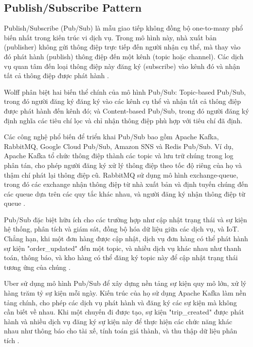 \subsection{Publish/Subscribe Pattern}
Publish/Subscribe (Pub/Sub) là mẫu giao tiếp không đồng bộ one-to-many phổ biến nhất trong kiến trúc vi dịch vụ. Trong mô hình này, nhà xuất bản (publisher) không gửi thông điệp trực tiếp đến người nhận cụ thể, mà thay vào đó phát hành (publish) thông điệp đến một kênh (topic hoặc channel). Các dịch vụ quan tâm đến loại thông điệp này đăng ký (subscribe) vào kênh đó và nhận tất cả thông điệp được phát hành \cite{hohpe2004}.

Wolff \cite{wolff2016} phân biệt hai biến thể chính của mô hình Pub/Sub: Topic-based Pub/Sub, trong đó người đăng ký đăng ký vào các kênh cụ thể và nhận tất cả thông điệp được phát hành đến kênh đó; và Content-based Pub/Sub, trong đó người đăng ký định nghĩa các tiêu chí lọc và chỉ nhận thông điệp phù hợp với tiêu chí đã định.

Các công nghệ phổ biến để triển khai Pub/Sub bao gồm Apache Kafka, RabbitMQ, Google Cloud Pub/Sub, Amazon SNS và Redis Pub/Sub. Ví dụ, Apache Kafka tổ chức thông điệp thành các topic và lưu trữ chúng trong log phân tán, cho phép người đăng ký xử lý thông điệp theo tốc độ riêng của họ và thậm chí phát lại thông điệp cũ. RabbitMQ sử dụng mô hình exchange-queue, trong đó các exchange nhận thông điệp từ nhà xuất bản và định tuyến chúng đến các queue dựa trên các quy tắc khác nhau, và người đăng ký nhận thông điệp từ queue \cite{jun2018}.

Pub/Sub đặc biệt hữu ích cho các trường hợp như cập nhật trạng thái và sự kiện hệ thống, phân tích và giám sát, đồng bộ hóa dữ liệu giữa các dịch vụ, và IoT. Chẳng hạn, khi một đơn hàng được cập nhật, dịch vụ đơn hàng có thể phát hành sự kiện "order\_updated" đến một topic, và nhiều dịch vụ khác nhau như thanh toán, thông báo, và kho hàng có thể đăng ký topic này để cập nhật trạng thái tương ứng của chúng \cite{newman2015}.

Uber sử dụng mô hình Pub/Sub để xây dựng nền tảng sự kiện quy mô lớn, xử lý hàng trăm tỷ sự kiện mỗi ngày. Kiến trúc của họ sử dụng Apache Kafka làm nền tảng chính, cho phép các dịch vụ phát hành và đăng ký các sự kiện mà không cần biết về nhau. Khi một chuyến đi được tạo, sự kiện "trip\_created" được phát hành và nhiều dịch vụ đăng ký sự kiện này để thực hiện các chức năng khác nhau như thông báo cho tài xế, tính toán giá thành, và thu thập dữ liệu phân tích \cite{beyer2018}.

